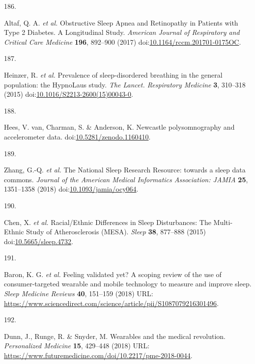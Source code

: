 \documentclass[
  10pt,
]{scrbook}
\newlength{\cslhangindent}
\newlength{\csllabelwidth}
\newlength{\cslentryspacingunit} %
\newenvironment{CSLReferences}[2] %
 {%
  \setlength{\parindent}{0pt}
  \ifodd #1
  \let\oldpar\par
  \def\par{\hangindent=\cslhangindent\oldpar}
  \fi
  \setlength{\parskip}{#2\cslentryspacingunit}
 }%
 {}
\newcommand{\CSLLeftMargin}[1]{\parbox[t]{\csllabelwidth}{#1}}
\newcommand{\CSLRightInline}[1]{\parbox[t]{\linewidth - \csllabelwidth}{#1}\break}
\let\originaltextbf\textbf
\renewcommand{\textbf}[1]{\textcolor{color1}{\textsf{\originaltextbf{#1}}}}
\begin{document}
\begin{CSLReferences}{0}{0}
\leavevmode{}%
\CSLLeftMargin{186. }%
\CSLRightInline{Altaf, Q. A. \emph{et al.} Obstructive Sleep Apnea and
Retinopathy in Patients with Type 2 Diabetes. A Longitudinal Study.
\emph{American Journal of Respiratory and Critical Care Medicine}
\textbf{196}, 892--900 (2017)
doi:\href{https://doi.org/10.1164/rccm.201701-0175OC}{10.1164/rccm.201701-0175OC}.}

\leavevmode{}%
\CSLLeftMargin{187. }%
\CSLRightInline{Heinzer, R. \emph{et al.} Prevalence of sleep-disordered
breathing in the general population: the HypnoLaus study. \emph{The
Lancet. Respiratory Medicine} \textbf{3}, 310--318 (2015)
doi:\href{https://doi.org/10.1016/S2213-2600(15)00043-0}{10.1016/S2213-2600(15)00043-0}.}

\leavevmode{}%
\CSLLeftMargin{188. }%
\CSLRightInline{Hees, V. van, Charman, S. \& Anderson, K. Newcastle
polysomnography and accelerometer data.
doi:\href{https://doi.org/10.5281/zenodo.1160410}{10.5281/zenodo.1160410}.}

\leavevmode{}%
\CSLLeftMargin{189. }%
\CSLRightInline{Zhang, G.-Q. \emph{et al.} The National Sleep Research
Resource: towards a sleep data commons. \emph{Journal of the American
Medical Informatics Association: JAMIA} \textbf{25}, 1351--1358 (2018)
doi:\href{https://doi.org/10.1093/jamia/ocy064}{10.1093/jamia/ocy064}.}

\leavevmode{}%
\CSLLeftMargin{190. }%
\CSLRightInline{Chen, X. \emph{et al.} Racial/Ethnic Differences in
Sleep Disturbances: The Multi-Ethnic Study of Atherosclerosis (MESA).
\emph{Sleep} \textbf{38}, 877--888 (2015)
doi:\href{https://doi.org/10.5665/sleep.4732}{10.5665/sleep.4732}.}

\leavevmode{}%
\CSLLeftMargin{191. }%
\CSLRightInline{Baron, K. G. \emph{et al.} Feeling validated yet? A
scoping review of the use of consumer-targeted wearable and mobile
technology to measure and improve sleep. \emph{Sleep Medicine Reviews}
\textbf{40}, 151--159 (2018) URL:
\url{https://www.sciencedirect.com/science/article/pii/S1087079216301496}.}

\leavevmode{}%
\CSLLeftMargin{192. }%
\CSLRightInline{Dunn, J., Runge, R. \& Snyder, M. Wearables and the
medical revolution. \emph{Personalized Medicine} \textbf{15}, 429--448
(2018) URL:
\url{https://www.futuremedicine.com/doi/10.2217/pme-2018-0044}.}


\end{CSLReferences}
\end{document}
